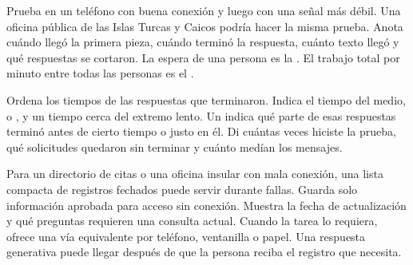 {Prueba en un teléfono con buena conexión y luego con una señal más débil. Una oficina pública de las Islas Turcas y Caicos podría hacer la misma prueba. Anota cuándo llegó la primera pieza, cuándo terminó la respuesta, cuánto texto llegó y qué respuestas se cortaron. La espera de una persona es la . El trabajo total por minuto entre todas las personas es el .

Ordena los tiempos de las respuestas que terminaron. Indica el tiempo del medio, o , y un tiempo cerca del extremo lento. Un  indica qué parte de esas respuestas terminó antes de cierto tiempo o justo en él. Di cuántas veces hiciste la prueba, qué solicitudes quedaron sin terminar y cuánto medían los mensajes.}

{Para un directorio de citas o una oficina insular con mala conexión, una lista compacta de registros fechados puede servir durante fallas. Guarda solo información aprobada para acceso sin conexión. Muestra la fecha de actualización y qué preguntas requieren una consulta actual. Cuando la tarea lo requiera, ofrece una vía equivalente por teléfono, ventanilla o papel. Una respuesta generativa puede llegar después de que la persona reciba el registro que necesita.}

